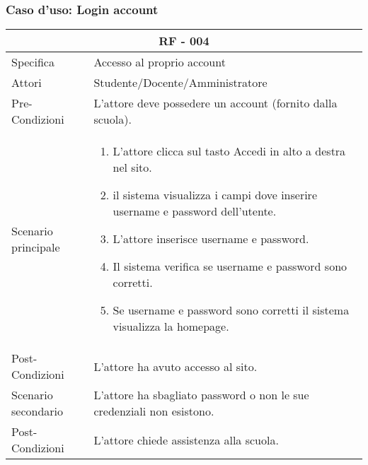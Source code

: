 \documentclass{article}
\begin{document}
\subsubsection{\textbf{Caso d'uso: Login account}}
\begin{tabular}{ |p{3cm}|p{9cm}|  }
	\hline
	\multicolumn{2}{|c|}{\textbf{RF - 004}} \\
	\hline
	Specifica& Accesso al proprio account\\
	\hline
	Attori& Studente/Docente/Amministratore\\
	\hline
	Pre-Condizioni& L'attore deve possedere un account (fornito dalla scuola).\\
	\hline
	Scenario principale& \begin{enumerate}
		\item L'attore clicca sul tasto Accedi in alto a destra nel sito.
		\item il sistema visualizza i campi dove inserire username e password dell'utente.
		\item L'attore inserisce username e password.
		\item Il sistema verifica se username e password sono corretti.
		\item Se username e password sono corretti il sistema visualizza la homepage.
	\end{enumerate}\\
	\hline
	Post-Condizioni& L'attore ha avuto accesso al sito.\\
	\hline
	Scenario secondario& L'attore ha sbagliato password o non le sue credenziali non esistono.\\
	\hline
	Post-Condizioni& L'attore chiede assistenza alla scuola.\\
	\hline
\end{tabular}
\end{document}
